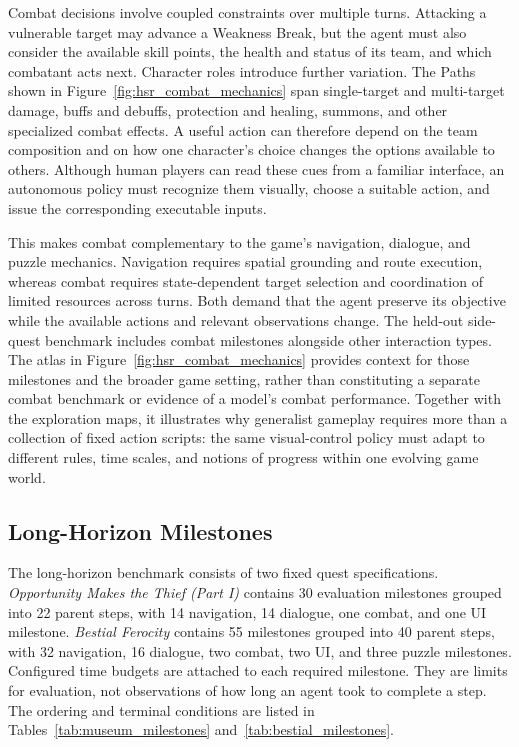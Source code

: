 Combat decisions involve coupled constraints over multiple turns. Attacking a vulnerable target may advance a Weakness Break, but the agent must also consider the available skill points, the health and status of its team, and which combatant acts next. Character roles introduce further variation. The Paths shown in Figure~\ref{fig:hsr_combat_mechanics} span single-target and multi-target damage, buffs and debuffs, protection and healing, summons, and other specialized combat effects. A useful action can therefore depend on the team composition and on how one character's choice changes the options available to others. Although human players can read these cues from a familiar interface, an autonomous policy must recognize them visually, choose a suitable action, and issue the corresponding executable inputs.

This makes combat complementary to the game's navigation, dialogue, and puzzle mechanics. Navigation requires spatial grounding and route execution, whereas combat requires state-dependent target selection and coordination of limited resources across turns. Both demand that the agent preserve its objective while the available actions and relevant observations change. The held-out side-quest benchmark includes combat milestones alongside other interaction types. The atlas in Figure~\ref{fig:hsr_combat_mechanics} provides context for those milestones and the broader game setting, rather than constituting a separate combat benchmark or evidence of a model's combat performance. Together with the exploration maps, it illustrates why generalist gameplay requires more than a collection of fixed action scripts: the same visual-control policy must adapt to different rules, time scales, and notions of progress within one evolving game world.


\subsection{Long-Horizon Milestones}

The long-horizon benchmark consists of two fixed quest specifications. \emph{Opportunity Makes the Thief (Part I)} contains 30 evaluation milestones grouped into 22 parent steps, with 14 navigation, 14 dialogue, one combat, and one UI milestone. \emph{Bestial Ferocity} contains 55 milestones grouped into 40 parent steps, with 32 navigation, 16 dialogue, two combat, two UI, and three puzzle milestones. Configured time budgets are attached to each required milestone. They are limits for evaluation, not observations of how long an agent took to complete a step. The ordering and terminal conditions are listed in Tables~\ref{tab:museum_milestones} and~\ref{tab:bestial_milestones}.

